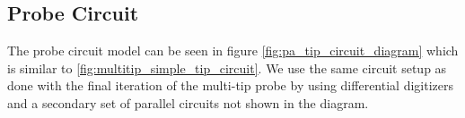 





\subsection{Probe Circuit}

The probe circuit model can be seen in figure \ref{fig:pa_tip_circuit_diagram} which is similar to \ref{fig:multitip_simple_tip_circuit}. We use the same circuit setup as done with the final iteration of the multi-tip probe by using differential digitizers and a secondary set of parallel circuits not shown in the diagram.

